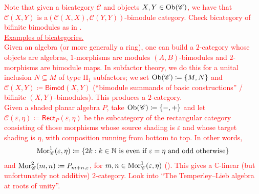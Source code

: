 \noindent\textcolor{red}{Note that given a bicategory $\mathscr{C}$ and objects $X, Y \in \textup{Ob}(\mathscr{C})$, we have that $\mathscr{C}(X, Y)$ is a\linebreak $(\mathscr{C}(X, X), \mathscr{C}(Y, Y))$-bimodule category. Check bicategory of bifinite bimodules as in \cite{DGG14}.}\\

\noindent\textcolor{red}{\underline{Examples of bicategories.}}\\

\noindent\textcolor{red}{Given an algebra (or more generally a ring), one can build a $2$-category whose objects are algebras, $1$-morphisms are modules $(A, B)$-bimodules and $2$-morphisms are bimodule maps. In subfactor theory, we do this for a unital inclusion $N \subseteq M$ of type II$_1$ subfactors; we set $\textup{Ob}(\mathscr{C}) \coloneqq \{M, N\}$ and $\mathscr{C}(X, Y) \coloneqq \textsf{Bimod}(X, Y)$ (``bimodule summands of basic constructions'' / bifinite $(X, Y)$-bimodules). This produces a $2$-category.}\\

\noindent\textcolor{red}{Given a shaded planar algebra $P$, take $\textup{Ob}(\mathscr{C}) \coloneqq \{-, +\}$ and let $\mathscr{C}(\varepsilon, \eta) \coloneqq \textsf{Rect}_P(\varepsilon, \eta)$ be the subcategory of the rectangular category consisting of those morphisms whose source shading is $\varepsilon$ and whose target shading is $\eta$, with composition running from bottom to top. In other words,
\begin{align*}
\begin{split}
\textup{Mor}_\mathscr{C}^1(\varepsilon, \eta) \coloneqq \{2k : \text{$k \in \mathbb{N}$ is even if $\varepsilon = \eta$ and odd otherwise}\}
\end{split}
\end{align*}
\noindent and $\textup{Mor}_\mathscr{C}^2(m, n) \coloneqq P_{m+n, \varepsilon}$, for $m, n \in \textup{Mor}_\mathscr{C}^1(\varepsilon, \eta)$ (\cite{DGG14}). This gives a $\mathbb{C}$-linear (but unfortunately not additive) $2$-category. Look into ``The Temperley--Lieb algebra at roots of unity''.}\\



